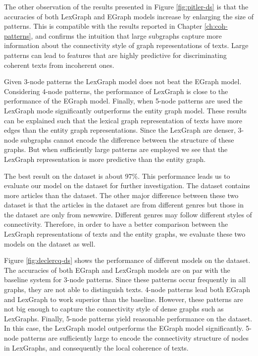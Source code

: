 The other observation of the results presented in Figure \ref{fig:pitler-ds} is that the accuracies of both \mbox{LexGraph} and EGraph models increase by enlarging the size of patterns.  
This is compatible with the results reported in Chapter \ref{ch:coh-patterns}, and confirms the intuition that large subgraphs capture more information about the connectivity style of graph representations of texts.
Large patterns can lead to features that are highly predictive for discriminating coherent texts from incoherent ones. 

Given 3-node patterns the LexGraph model does not beat the EGraph model. 
Considering \mbox{4-node} patterns, the performance of LexGraph is close to the performance of the EGraph model. 
Finally, when 5-node patterns are used the LexGraph mode significantly outperforms the entity graph model. 
These results can be explained such that the lexical graph representation of texts have more edges than the entity graph representations. 
Since the LexGraph are denser, 3-node subgraphs cannot encode the difference between the structure of these graphs. 
But when sufficiently large patterns are employed we see that the LexGraph representation is more predictive than the entity graph.   

The best result on the \pitlerds dataset is about 97\%. 
This performance leads us to evaluate our model on the \declercqds dataset for further investigation. 
The \declercqds dataset contains more articles than the \pitlerds dataset. 
The other major difference between these two dataset is that the articles in the \declercqds dataset are from different genres but those in the \pitlerds dataset are only from newswire. 
Different genres may follow different styles of connectivity. 
Therefore, in order to have a better comparison between the LexGraph representations of texts and the entity graphs, we evaluate these two models on the \declercqds dataset as well. 

Figure \ref{fig:declercq-ds} shows the performance of different models on the \declercqds dataset.   
The accuracies of both EGraph and LexGraph models are on par with the baseline system for 3-node patterns. 
Since these patterns occur frequently in all graphs, they are not able to distinguish texts. 
4-node patterns lead both EGraph and LexGraph to work superior than the baseline. 
However, these patterns are not big enough to capture the connectivity style of dense graphs such as LexGraphs. 
Finally, 5-node patterns yield reasonable performance on the \declercqds dataset. 
In this case, the LexGraph model outperforms the EGraph model significantly. 
5-node patterns are sufficiently large to encode the connectivity structure of nodes in LexGraphs, and consequently the local coherence of texts. 

